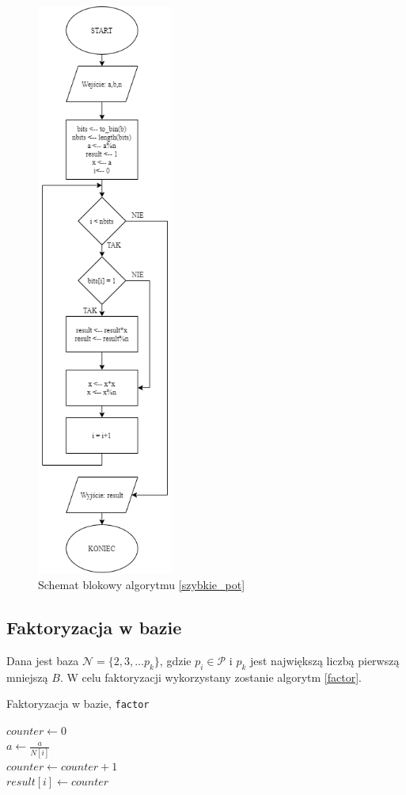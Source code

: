 \documentclass[]{article}
\begin{document}
	\begin{figure}[H]
		\begin{center}
			\includegraphics[width=4.5cm]{alg 3.png} \caption{Schemat blokowy algorytmu \ref{szybkie_pot}}
		\end{center}
	\end{figure}
	
	\subsection{Faktoryzacja w bazie}
		Dana jest baza \(\mathcal{N} = \{2, 3, \dots p_k\}\), gdzie \(p_i \in \mathcal{P}\) i \(p_k\) jest największą liczbą pierwszą mniejszą \(B\). 
		W celu faktoryzacji wykorzystany zostanie algorytm \ref{factor}.
		\newline
		\begin{algorithm}[H]
			\SetAlgoLined
			\caption{Faktoryzacja w bazie, \texttt{factor}}
			\label{factor}
			{
				\(counter \gets 0\) \\
				{
					\(a \gets \frac{a}{N[i]}\) \\
					\(counter \gets counter + 1\) \\
				}
				\(result[i] \gets counter\) \\
			}
		\end{algorithm}
	
\end{document}

